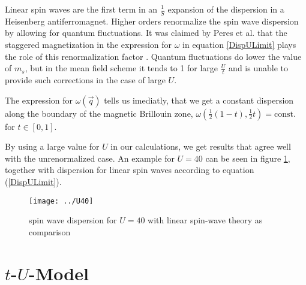 Linear spin waves are the first term in an $\frac1S$ expansion of the dispersion in a Heisenberg antiferromagnet.
Higher orders renormalize the spin wave dispersion by allowing for quantum fluctuations.
It was claimed by Peres et al. that the staggered magnetization in the expression for $\omega$ in equation \ref{DispULimit} 
plays the role of this renormalization factor \cite{PhysRevB.65.132404}.
Quantum fluctuations do lower the value of $m_s$, but in the mean field scheme it tends to 1 for large $\frac Ut$ 
and is unable to provide such corrections in the case of large $U$.

The expression for $\omega(\vec q)$ tells us imediatly, that we get a constant dispersion along the 
boundary of the magnetic Brillouin zone, $\omega(\frac12(1-t), \frac12t) =\mathrm{const.}$ for $t \in [0,1]$.


By using a large value for $U$ in our calculations, we get results that agree well with the unrenormalized case.
An example for $U=40$ can be seen in figure \ref{largeU}, together with dispersion for linear spin waves according to equation (\ref{DispULimit}).
%
\begin{figure}
 \begin{center}
  \texttt{[image: ../U40]}
  \caption{spin wave dispersion for $U=40$ with linear spin-wave theory as comparison}
 \label{largeU}
  \end{center}
\end{figure}
%
  
\newpage

\section{$t$-$U$-Model}

